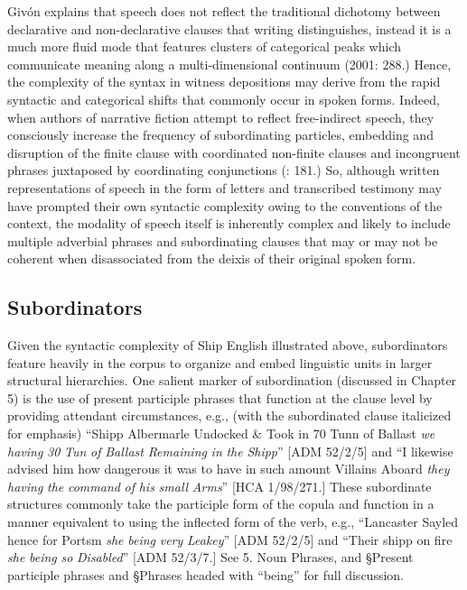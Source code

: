 Givón explains that speech does not reflect the traditional dichotomy between declarative and non-declarative clauses that writing distinguishes, instead it is a much more fluid mode that features clusters of categorical peaks which communicate meaning along a multi-dimensional continuum (2001: 288.) Hence, the complexity of the syntax in witness depositions may derive from the rapid syntactic and categorical shifts that commonly occur in spoken forms. Indeed, when authors of narrative fiction attempt to reflect free-indirect speech, they consciously increase the frequency of subordinating particles, embedding and disruption of the finite clause with coordinated non-finite clauses and incongruent phrases juxtaposed by coordinating conjunctions (\citealt{Sotirova2016}: 181.) So, although written representations of speech in the form of letters and transcribed testimony may have prompted their own syntactic complexity owing to the conventions of the context, the modality of speech itself is inherently complex and likely to include multiple adverbial phrases and subordinating clauses that may or may not be coherent when disassociated from the deixis of their original spoken form.   

\subsection{\textbf{Subordinators}}%

  Given the syntactic complexity of Ship English illustrated above, subordinators feature heavily in the corpus to organize and embed linguistic units in larger structural hierarchies. One salient marker of subordination (discussed in Chapter 5) is the use of present participle phrases that function at the clause level by providing attendant circumstances, e.g., (with the subordinated clause italicized for emphasis) “Shipp Albermarle Undocked \& Took in 70 Tunn of Ballast \textit{we} \textit{having} \textit{30} \textit{Tun} \textit{of} \textit{Ballast} \textit{Remaining} \textit{in} \textit{the} \textit{Shipp}” [ADM 52/2/5] and “I likewise advised him how dangerous it was to have in such amount Villains Aboard \textit{they} \textit{having} \textit{the} \textit{command} \textit{of} \textit{his} \textit{small} \textit{Arms}” [HCA 1/98/271.] These subordinate structures commonly take the participle form of the copula and function in a manner equivalent to using the inflected form of the verb, e.g., “Lancaster Sayled hence for Portsm \textit{she} \textit{being} \textit{very} \textit{Leakey}” [ADM 52/2/5] and “Their shipp on fire \textit{she} \textit{being} \textit{so} \textit{Disabled}” [ADM 52/3/7.] See 5. Noun Phrases, and §Present participle phrases and §Phrases headed with “being” for full discussion.

